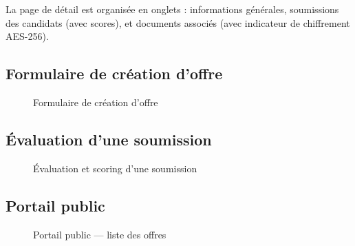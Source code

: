 La page de détail est organisée en onglets : informations générales, soumissions des candidats (avec scores), et documents associés (avec indicateur de chiffrement AES-256).

\subsection{Formulaire de création d'offre}

\begin{figure}[ht]
\centering
{}
\caption{Formulaire de création d'offre}
\label{fig:creation_offre}
\end{figure}

\subsection{Évaluation d'une soumission}

\begin{figure}[ht]
\centering
{}
\caption{Évaluation et scoring d'une soumission}
\label{fig:evaluation}
\end{figure}

\subsection{Portail public}

\begin{figure}[ht]
\centering
{}
\caption{Portail public — liste des offres}
\label{fig:portail}
\end{figure}

